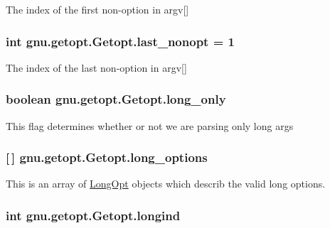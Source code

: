 \label{classgnu_1_1getopt_1_1_getopt_a2af5425ca486d7546c261d5f9f45ed26}
The index of the first non-\/option in argv\mbox{[}\mbox{]} \hypertarget{classgnu_1_1getopt_1_1_getopt_aaca077ce23c672df0a638fbb63898446}{
\subsubsection[{last\_\-nonopt}]{\setlength{\rightskip}{0pt plus 5cm}int {\bf gnu.getopt.Getopt.last\_\-nonopt} = 1}}
\label{classgnu_1_1getopt_1_1_getopt_aaca077ce23c672df0a638fbb63898446}
The index of the last non-\/option in argv\mbox{[}\mbox{]} \hypertarget{classgnu_1_1getopt_1_1_getopt_a81e9a30f84d4dc8e7b28e1d1dcecbd4c}{
\subsubsection[{long\_\-only}]{\setlength{\rightskip}{0pt plus 5cm}boolean {\bf gnu.getopt.Getopt.long\_\-only}}}
\label{classgnu_1_1getopt_1_1_getopt_a81e9a30f84d4dc8e7b28e1d1dcecbd4c}
This flag determines whether or not we are parsing only long args \hypertarget{classgnu_1_1getopt_1_1_getopt_a5baa01494994d09203b475edd9c9eb98}{
\subsubsection[{long\_\-options}]{ \mbox{[}$\,$\mbox{]} {\bf gnu.getopt.Getopt.long\_\-options}}}
\label{classgnu_1_1getopt_1_1_getopt_a5baa01494994d09203b475edd9c9eb98}
This is an array of \hyperlink{classgnu_1_1getopt_1_1_long_opt}{LongOpt} objects which describ the valid long options. \hypertarget{classgnu_1_1getopt_1_1_getopt_af0fee3aa183afb5b5326894bf0c25f64}{
\subsubsection[{longind}]{\setlength{\rightskip}{0pt plus 5cm}int {\bf gnu.getopt.Getopt.longind}}}
